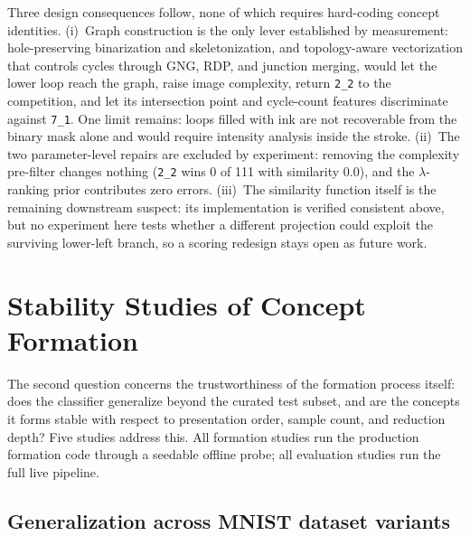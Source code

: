 \documentclass[conference]{IEEEtran}
\newcommand{\cid}[1]{\texttt{#1}}   %
\begin{document}
Three design consequences follow, none of which requires hard-coding
concept identities. (i)~Graph construction is the only lever established
by measurement: hole-preserving binarization and skeletonization, and
topology-aware vectorization that controls cycles through GNG, RDP, and
junction merging, would let the lower loop reach the graph, raise image
complexity, return \cid{2\_2} to the competition, and let its intersection
point and cycle-count features discriminate against \cid{7\_1}. One
limit remains: loops filled with ink are not recoverable from the binary
mask alone and would require intensity analysis inside the stroke.
(ii)~The two parameter-level repairs are excluded by experiment:
removing the complexity pre-filter changes nothing (\cid{2\_2}
wins 0 of 111 with similarity 0.0), and the $\lambda$-ranking prior
contributes zero errors. (iii)~The similarity
function itself is the remaining downstream suspect: its implementation is
verified consistent above, but no experiment here tests whether a
different projection could exploit the surviving lower-left branch, so a
scoring redesign stays open as future work.

\section{Stability Studies of Concept Formation}
\label{sec:studies}

The second question concerns the trustworthiness of the
formation process itself: does the classifier generalize beyond the
curated test subset, and are the concepts it forms stable with respect to
presentation order, sample count, and reduction depth? Five studies
address this. All formation studies run the production formation
code through a seedable offline probe; all evaluation studies run the full
live pipeline.

\subsection{Generalization across MNIST dataset variants}
\label{sec:datasets}
\end{document}
